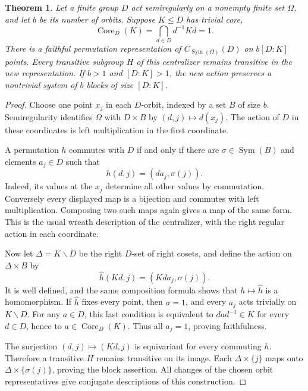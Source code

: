 \documentclass[11pt,a4paper]{article}
\newtheorem{theorem}{Theorem}
\newcommand{\Sym}{\operatorname{Sym}}
\newcommand{\Core}{\operatorname{Core}}
\begin{document}
\begin{theorem}\label{reduce}
Let a finite group $D$ act semiregularly on a nonempty finite set $\Omega$,
and let $b$ be its number of orbits. Suppose $K\leq D$ has trivial core,
\[
                \Core_D(K)=\bigcap_{d\in D}d^{-1}Kd=1.
\]
There is a faithful permutation representation of
$C_{\Sym(\Omega)}(D)$ on $b[D:K]$ points. Every transitive subgroup
$H$ of this centralizer remains transitive in the new representation.
If $b>1$ and $[D:K]>1$, the new action preserves a nontrivial system of
$b$ blocks of size $[D:K]$.
\end{theorem}
\begin{proof}
Choose one point $x_j$ in each $D$-orbit, indexed by a set $B$ of size $b$.
Semiregularity identifies $\Omega$ with $D\times B$ by
$(d,j)\mapsto d(x_j)$. The action of $D$ in these coordinates is left
multiplication in the first coordinate.

A permutation $h$ commutes with $D$ if and only if there are
$\sigma\in\Sym(B)$ and elements $a_j\in D$ such that
\[
                 h(d,j)=(d a_j,\sigma(j)).
\]
Indeed, its values at the $x_j$ determine all other values by commutation.
Conversely every displayed map is a bijection and commutes with left
multiplication. Composing two such maps again gives a map of the same form.
This is the usual wreath description of the centralizer, with the right
regular action in each coordinate.

Now let $\Delta=K\backslash D$ be the right $D$-set of right cosets, and
define the action on $\Delta\times B$ by
\[
             \widehat h(Kd,j)=(Kd a_j,\sigma(j)).
\]
It is well defined, and the same composition formula shows that
$h\mapsto\widehat h$ is a homomorphism. If $\widehat h$ fixes every
point, then $\sigma=1$, and every $a_j$ acts trivially on $K\backslash D$.
For any $a\in D$, this last condition is equivalent to
$d a d^{-1}\in K$ for every $d\in D$, hence to $a\in\Core_D(K)$.
Thus all $a_j=1$, proving faithfulness.

The surjection $(d,j)\mapsto(Kd,j)$ is equivariant for every commuting
$h$. Therefore a transitive $H$ remains transitive on its image. Each
$\Delta\times\{j\}$ maps onto $\Delta\times\{\sigma(j)\}$, proving
the block assertion. All changes of the chosen orbit representatives
give conjugate descriptions of this construction.
\end{proof}
\end{document}
